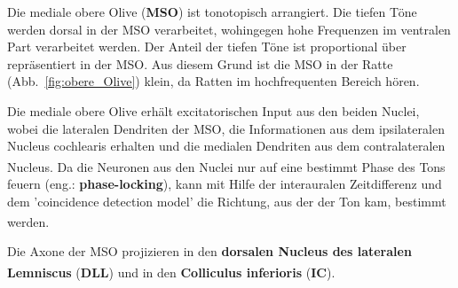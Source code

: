 \documentclass[12pt,a4paper,pdftex]{article}
\begin{document}
\noindent Die mediale obere Olive (\textbf{MSO}) ist tonotopisch arrangiert. Die tiefen Töne werden dorsal in der MSO verarbeitet, wohingegen hohe Frequenzen im ventralen Part verarbeitet werden. Der Anteil der tiefen Töne ist proportional über repräsentiert in der MSO. Aus diesem Grund ist die MSO in der Ratte (Abb.~\ref{fig:obere_Olive}) klein, da Ratten im hochfrequenten Bereich hören.

Die mediale obere Olive erhält excitatorischen Input aus den beiden Nuclei, wobei die lateralen Dendriten der MSO, die Informationen aus dem ipsilateralen Nucleus cochlearis erhalten und die medialen Dendriten aus dem contralateralen Nucleus\textsuperscript{\cite[29]{paxinos2014rat}}. Da die Neuronen aus den Nuclei nur auf eine bestimmt Phase des Tons feuern (eng.: \textbf{phase-locking}), kann mit Hilfe der interauralen Zeitdifferenz und dem 'coincidence detection model' die Richtung, aus der der Ton kam, bestimmt werden\textsuperscript{\cite[31]{kandel2013principles}}.

Die Axone der MSO projizieren in den \textbf{dorsalen Nucleus des lateralen Lemniscus} (\textbf{DLL}) und in den \textbf{Colliculus inferioris} (\textbf{IC})\textsuperscript{\cite[29]{paxinos2014rat}}.
\\

\end{document}
